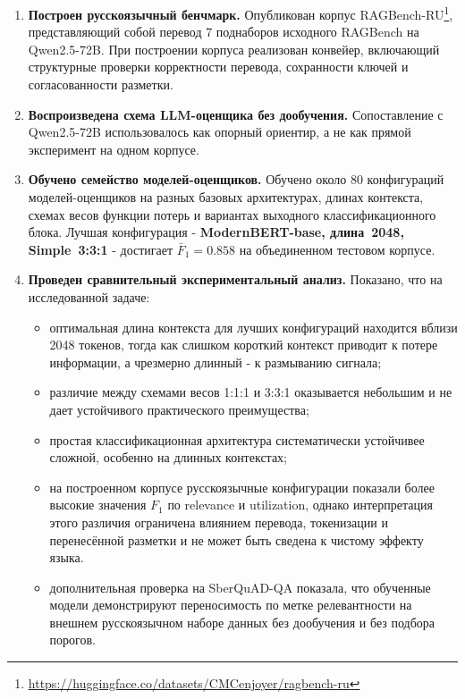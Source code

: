 \begin{enumerate}
  \item \textbf{Построен русскоязычный бенчмарк.}
  Опубликован корпус RAGBench-RU\footnote{\url{https://huggingface.co/datasets/CMCenjoyer/ragbench-ru}},
  представляющий собой перевод 7 поднаборов исходного RAGBench на Qwen2.5-72B.
  При построении корпуса реализован конвейер, включающий структурные проверки
  корректности перевода, сохранности ключей и согласованности разметки.

  \item \textbf{Воспроизведена схема LLM-оценщика без дообучения.}
  Сопоставление с Qwen2.5-72B использовалось как опорный ориентир,
   а не как прямой эксперимент на одном корпусе.
  \item \textbf{Обучено семейство моделей-оценщиков.}
  Обучено около 80 конфигураций моделей-оценщиков на разных базовых архитектурах, длинах
  контекста, схемах весов функции потерь и вариантах выходного классификационного блока. Лучшая
  конфигурация - \textbf{ModernBERT-base, длина~2048, Simple~3:3:1} -
  достигает $\bar{F}_1 = 0.858$ на объединенном тестовом корпусе.

  \item \textbf{Проведен сравнительный экспериментальный анализ.}
  Показано, что на исследованной задаче:
    \begin{itemize}
      \item оптимальная длина контекста для лучших конфигураций находится вблизи 2048
      токенов, тогда как слишком короткий контекст приводит к потере информации, а
      чрезмерно длинный - к размыванию сигнала;
      \item различие между схемами весов 1:1:1 и 3:3:1 оказывается небольшим и не дает
      устойчивого практического преимущества;
      \item простая классификационная архитектура систематически устойчивее сложной,
      особенно на длинных контекстах;
      \item на построенном корпусе русскоязычные конфигурации показали более
      высокие значения $F_1$ по relevance и utilization, однако интерпретация
      этого различия ограничена влиянием перевода, токенизации и перенесённой
      разметки и не может быть сведена к чистому эффекту языка.
      \item дополнительная проверка на SberQuAD-QA показала, что обученные модели 
      демонстрируют переносимость
      по метке релевантности на внешнем русскоязычном
      наборе данных без дообучения и без подбора порогов.


\end{itemize}
\end{enumerate}
